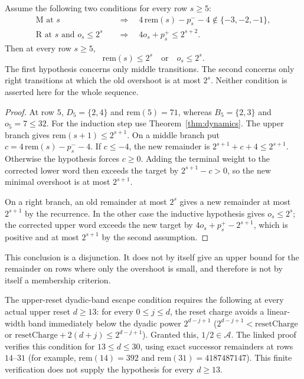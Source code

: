 \begin{thm}
\label{thm:two-sided-dyadic}
Assume the following two conditions for every row $s\ge5$:
\[
 \begin{aligned}
 \mathrm M\text{ at }s&\quad\Longrightarrow\quad
 4\,\mathrm{rem}(s)-p_s^--4\notin\{-3,-2,-1\},\\
 \mathrm R\text{ at }s\text{ and }o_s\le2^s
 &\quad\Longrightarrow\quad 4o_s+p_s^+\le2^{s+2}.
 \end{aligned}
\]
Then at every row $s\ge5$,
\[
 \mathrm{rem}(s)\le2^s\quad\text{or}\quad o_s\le2^s.
\]
The first hypothesis concerns only middle transitions.  The second
concerns only right transitions at which the old overshoot is at most
$2^s$.  Neither condition is asserted here for the whole sequence.
\end{thm}
\begin{proof}
At row $5$, $D_5=\{2,4\}$ and $\mathrm{rem}(5)=71$, whereas
$B_5=\{2,3\}$ and $o_5=7\le32$.  For the induction step use
Theorem~\ref{thm:dynamics}.  The upper branch gives
$\mathrm{rem}(s+1)\le2^{s+1}$.  On a middle branch put
$c=4\,\mathrm{rem}(s)-p_s^--4$.  If $c\le-4$, the new remainder
is $2^{s+1}+c+4\le2^{s+1}$.  Otherwise the hypothesis forces
$c\ge0$.  Adding the terminal weight to the corrected lower word
then exceeds the target by $2^{s+1}-c>0$, so the new minimal
overshoot is at most $2^{s+1}$.

On a right branch, an old remainder at most $2^s$ gives a new
remainder at most $2^{s+1}$ by the recurrence.  In the other case
the inductive hypothesis gives $o_s\le2^s$; the corrected upper
word exceeds the new target by $4o_s+p_s^+-2^{s+1}$, which is
positive and at most $2^{s+1}$ by the second assumption.
\end{proof}
This conclusion is a disjunction.  It does not by itself give an
upper bound for the remainder on rows where only the overshoot is
small, and therefore is not by itself a membership criterion.

\begin{thm}
\label{thm:upper-reset-band}
The upper-reset dyadic-band escape condition requires the following at every
actual upper reset $d\ge13$: for every $0\le j\le d$, the
reset charge avoids a linear-width band immediately below the dyadic power
$2^{d-j+1}$ ($2^{d-j+1}<\mathrm{resetCharge}$ or
$\mathrm{resetCharge}+2(d+j)\le 2^{d-j+1}$). Granted this, $1/2\in
\ensuremath{\mathcal A}$. The linked proof verifies this condition for
$13\le d\le30$, using exact successor remainders at rows $14$--$31$
(for example, $\mathrm{rem}(14)=392$ and
$\mathrm{rem}(31)=4187487147$). This finite verification does not
supply the hypothesis for every $d\ge13$.
\end{thm}


